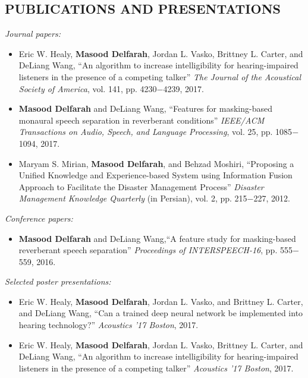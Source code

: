 \documentclass[margin, 10pt]{res}
\begin{document}
\begin{resume}
\section{PUBLICATIONS AND PRESENTATIONS}
\textit{Journal papers:}
\begin{itemize}\setlength\itemsep{-0.3em}
\item Eric W. Healy, \textbf{Masood Delfarah}, Jordan L. Vasko, Brittney L. Carter, and DeLiang Wang, ``An algorithm to increase intelligibility for hearing-impaired listeners in the presence of a competing talker'' \textit{The Journal of the Acoustical Society of America}, vol. 141, pp. 4230$-$4239, 2017.
\item \textbf{Masood Delfarah} and DeLiang Wang, ``Features for masking-based monaural speech separation in reverberant conditions'' \textit{IEEE/ACM Transactions on Audio, Speech, and Language Processing}, vol. 25, pp. 1085$-$1094, 2017.
\item Maryam S. Mirian, \textbf{Masood Delfarah}, and Behzad Moshiri, ``Proposing a Unified Knowledge and Experience-based System using Information Fusion Approach to Facilitate the Disaster Management Process'' \textit{Disaster Management Knowledge Quarterly} (in Persian), vol. 2, pp. 215$-$227, 2012. 
\end{itemize}
\textit{Conference papers:}
\begin{itemize}\setlength\itemsep{-0.3em}
\item \textbf{Masood Delfarah} and DeLiang Wang,``A feature study for masking-based reverberant speech separation'' \textit{Proceedings of INTERSPEECH-16}, pp. 555$-$559, 2016.
\end{itemize}
\textit{Selected poster presentations:}
\begin{itemize}\setlength\itemsep{-0.3em}
\item Eric W. Healy, \textbf{Masood Delfarah}, Jordan L. Vasko, and Brittney L. Carter, and DeLiang Wang, ``Can a trained deep neural network be implemented into hearing technology?'' \textit{Acoustics '17 Boston}, 2017.
\item Eric W. Healy, \textbf{Masood Delfarah}, Jordan L. Vasko, Brittney L. Carter, and DeLiang Wang, ``An algorithm to increase intelligibility for hearing-impaired listeners in the presence of a competing talker'' \textit{Acoustics '17 Boston}, 2017.
\end{itemize}

\end{resume}
\end{document}
